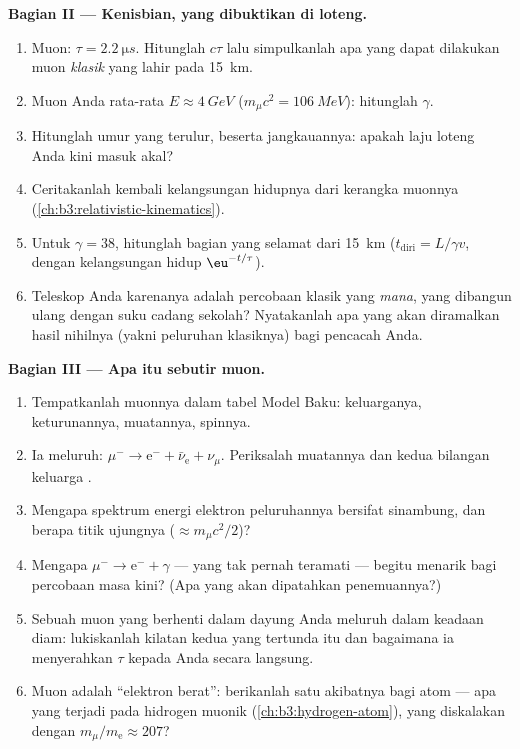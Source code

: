 \begin{problem}
\medskip\noindent\textbf{Bagian II --- Kenisbian, yang dibuktikan di loteng.}

\begin{enumerate}[resume]
  \item Muon: $\tau = \qty{2.2}{\micro s}$. Hitunglah $c\tau$ lalu
        simpulkanlah apa yang dapat dilakukan muon \emph{klasik} yang lahir pada
        \qty{15}{km}.
  \item Muon Anda rata-rata $E \approx \qty{4}{GeV}$
        ($m_\mu c^2 = \qty{106}{MeV}$): hitunglah $\gamma$.
  \item Hitunglah umur yang terulur, beserta jangkauannya: apakah
        laju loteng Anda kini masuk akal?
  \item Ceritakanlah kembali kelangsungan hidupnya dari kerangka muonnya
        (\cref{ch:b3:relativistic-kinematics}).
  \item Untuk $\gamma = 38$, hitunglah bagian yang selamat dari
        \qty{15}{km} ($t_{\text{diri}} = L/\gamma v$, dengan kelangsungan hidup
        $\eu^{-t/\tau}$).
  \item Teleskop Anda karenanya adalah percobaan klasik yang
        \emph{mana}, yang dibangun ulang dengan suku cadang sekolah? Nyatakanlah apa yang
        akan diramalkan hasil nihilnya (yakni peluruhan klasiknya) bagi
        pencacah Anda.
\end{enumerate}

\medskip\noindent\textbf{Bagian III --- Apa itu sebutir muon.}

\begin{enumerate}[resume]
  \item Tempatkanlah muonnya dalam tabel Model Baku: keluarganya,
        keturunannya, muatannya, spinnya.
  \item Ia meluruh: $\mu^- \to \text{e}^- + \bar\nu_{\text{e}} +
        \nu_\mu$. Periksalah muatannya dan kedua bilangan keluarga .
  \item Mengapa spektrum energi elektron peluruhannya bersifat sinambung,
        dan berapa titik ujungnya ($\approx m_\mu c^2/2$)?
  \item Mengapa $\mu^- \to \text{e}^- + \gamma$ --- yang tak pernah
        teramati --- begitu menarik bagi percobaan masa kini?
        (Apa yang akan dipatahkan penemuannya?)
  \item Sebuah muon yang berhenti dalam dayung Anda meluruh dalam keadaan diam: lukiskanlah
        kilatan kedua yang tertunda itu dan bagaimana ia menyerahkan $\tau$
        kepada Anda secara langsung.
  \item Muon adalah ``elektron berat'': berikanlah satu akibatnya bagi
        atom --- apa yang terjadi pada  hidrogen muonik
        (\cref{ch:b3:hydrogen-atom}), yang diskalakan dengan
        $m_\mu/m_{\text{e}} \approx 207$?
\end{enumerate}


\end{problem}
